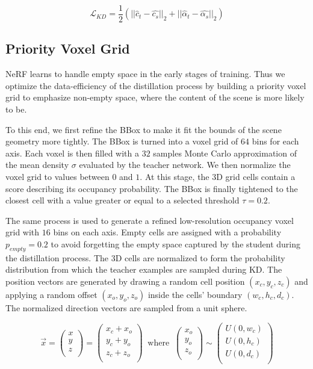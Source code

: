 \begin{equation}
    \mathcal{L}_{KD} = \frac{1}{2} (||\hat{c}_t - \hat{c_s}||_2 + ||\hat{\alpha}_t - \hat{\alpha_s}||_2)
\end{equation}

\subsection{Priority Voxel Grid}

\gls{NeRF} learns to handle empty space in the early stages of training. Thus we optimize the data-efficiency of the distillation process by building a priority voxel grid to emphasize non-empty space, where the content of the scene is more likely to be.

To this end, we first refine the \gls{BBox} to make it fit the bounds of the scene geometry more tightly. The \gls{BBox} is turned into a voxel grid of $64$ bins for each axis. Each voxel is then filled with a $32$ samples Monte Carlo approximation of the mean density $\sigma$ evaluated by the teacher network. We then normalize the voxel grid to values between $0$ and $1$. At this stage, the 3D grid cells contain a score describing its occupancy probability. The \gls{BBox} is finally tightened to the closest cell with a value greater or equal to a selected threshold $\tau = 0.2$.

The same process is used to generate a refined low-resolution occupancy voxel grid with $16$ bins on each axis. Empty cells are assigned with a probability $p_{empty} = 0.2$ to avoid forgetting the empty space captured by the student during the distillation process. The 3D cells are normalized to form the probability distribution from which the teacher examples are sampled during \gls{KD}. The position vectors are generated by drawing a random cell position $(x_c, y_c, z_c)$ and applying a random offset $(x_o, y_o, z_o)$ inside the cells' boundary $(w_c, h_c, d_c)$. The normalized direction vectors are sampled from a unit sphere.

\begin{equation}
    \vec{x} = 
    \begin{pmatrix} x \\ y \\ z \\ \end{pmatrix} =
    \begin{pmatrix} x_c + x_o \\ y_c + y_o \\ z_c + z_o \\ \end{pmatrix}
    \;\; \text{where} \;\; \begin{pmatrix} x_o \\ y_o \\ z_o \\ \end{pmatrix}
    \sim  \begin{pmatrix} U(0, w_c) \\ U(0, h_c) \\ U(0, d_c) \\ \end{pmatrix}
\end{equation}

